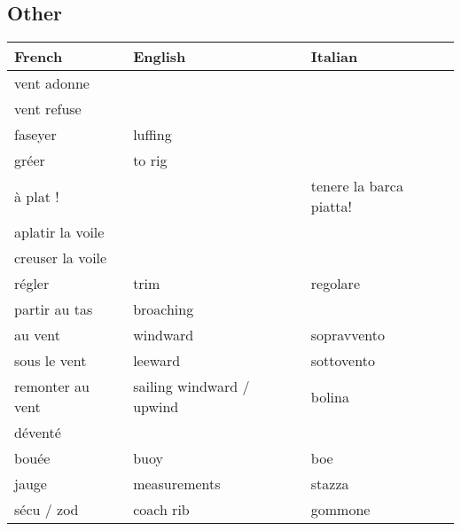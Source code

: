 \documentclass[a4paper, 12pt, twoside]{article}
\begin{document}
    \begin{indt}{\section{Other}} %
        \begin{tabular}{|l|l|l|}
            \hline %
            \textbf{French}
            & \textbf{English}
            & \textbf{Italian}
            \\
            \hline
            \hline %
            vent adonne %
            &
            &
            \\
            \hline %
            vent refuse %
            &
            &
            \\
            \hline %
            faseyer %
            & luffing
            &
            \\
            \hline %
            gréer %
            & to rig
            &
            \\
            \hline %
            à plat ! %
            &
            & tenere la barca piatta!
            \\
            \hline %
            aplatir la voile %
            &
            &
            \\
            \hline %
            creuser la voile %
            &
            &
            \\
            \hline %
            régler %
            & trim
            & regolare
            \\
            \hline %
            partir au tas %
            & broaching
            &
            \\
            \hline %
            au vent %
            & windward
            & sopravvento
            \\
            \hline %
            sous le vent %
            & leeward
            & sottovento
            \\
            \hline %
            remonter au vent %
            & sailing windward / upwind
            & bolina
            \\
            \hline %
            déventé %
            &
            &
            \\
            \hline %
            bouée %
            & buoy
            & boe
            \\
            \hline %
            jauge %
            & measurements
            & stazza
            \\
            \hline %
            sécu / zod %
            & coach rib
            & gommone
            \\
            \hline %
        \end{tabular}
    \end{indt} %
\end{document}
